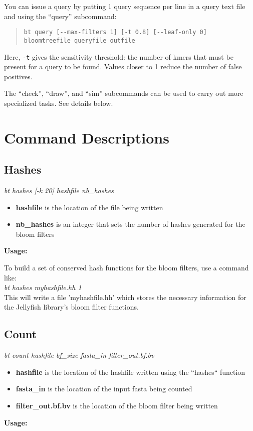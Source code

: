\documentclass{article}
\begin{document}
You can issue a query by putting 1 query sequence per line in a query text file and using the ``query'' subcommand:
\begin{quote}
\begin{verbatim}
bt query [--max-filters 1] [-t 0.8] [--leaf-only 0] bloomtreefile queryfile outfile
\end{verbatim}
\end{quote}
Here, \verb+-t+ gives the sensitivity threshold: the number of kmers that must be present for a query to be found. Values closer to 1 reduce the number of false positives. 

The ``check'', ``draw'', and ``sim'' subcommands can be used to carry out more specialized tasks. See details below.

\section{Command Descriptions}

\subsection{Hashes} 
\textit{bt hashes [-k 20] hashfile nb\_hashes}
\begin{itemize}
\item \textbf{hashfile} is the location of the file being written
\item \textbf{nb\_hashes} is an integer that sets the number of hashes generated for the bloom filters
\end{itemize}
\textbf{Usage:}

To build a set of conserved hash functions for the bloom filters, use a command like: \\

\textit{bt hashes myhashfile.hh 1} \\

This will write a file 'myhashfile.hh' which stores the necessary information for the Jellyfish library's bloom filter functions.

\subsection{Count}
\textit{bt count hashfile bf\_size fasta\_in filter\_out.bf.bv}
\begin{itemize}
\item \textbf{hashfile} is the location of the hashfile written using the ``hashes`` function
\item \textbf{fasta\_in} is the location of the input fasta being counted
\item \textbf{filter\_out.bf.bv} is the location of the bloom filter being written
\end{itemize}
\textbf{Usage:}
\end{document}
